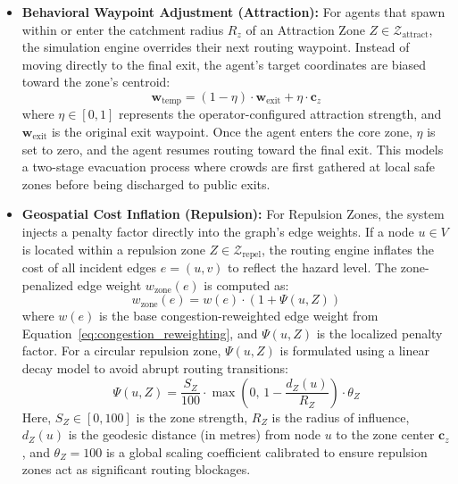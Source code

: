 \documentclass[12pt,a4paper,oneside]{report}
\begin{document}
\begin{itemize}
    \item \textbf{Behavioral Waypoint Adjustment (Attraction):} For agents that spawn within or enter the catchment radius $R_z$ of an Attraction Zone $Z \in \mathcal{Z}_{\text{attract}}$, the simulation engine overrides their next routing waypoint. Instead of moving directly to the final exit, the agent's target coordinates are biased toward the zone's centroid:
    \begin{equation}
    \mathbf{w}_{\text{temp}} = (1 - \eta) \cdot \mathbf{w}_{\text{exit}} + \eta \cdot \mathbf{c}_z
    \label{eq:attraction_waypoint}
    \end{equation}
    where $\eta \in [0, 1]$ represents the operator-configured attraction strength, and $\mathbf{w}_{\text{exit}}$ is the original exit waypoint. Once the agent enters the core zone, $\eta$ is set to zero, and the agent resumes routing toward the final exit. This models a two-stage evacuation process where crowds are first gathered at local safe zones before being discharged to public exits.
    
    \item \textbf{Geospatial Cost Inflation (Repulsion):} For Repulsion Zones, the system injects a penalty factor directly into the graph's edge weights. If a node $u \in V$ is located within a repulsion zone $Z \in \mathcal{Z}_{\text{repel}}$, the routing engine inflates the cost of all incident edges $e = (u, v)$ to reflect the hazard level. The zone-penalized edge weight $w_{\text{zone}}(e)$ is computed as:
    \begin{equation}
    w_{\text{zone}}(e) = w(e) \cdot \left(1 + \Psi(u, Z)\right)
    \label{eq:repulsion_inflation}
    \end{equation}
    where $w(e)$ is the base congestion-reweighted edge weight from Equation~\ref{eq:congestion_reweighting}, and $\Psi(u, Z)$ is the localized penalty factor. For a circular repulsion zone, $\Psi(u, Z)$ is formulated using a linear decay model to avoid abrupt routing transitions:
    \begin{equation}
    \Psi(u, Z) = \frac{S_Z}{100} \cdot \max\left(0, \, 1 - \frac{d_Z(u)}{R_Z}\right) \cdot \theta_Z
    \label{eq:repulsion_decay}
    \end{equation}
    Here, $S_Z \in [0, 100]$ is the zone strength, $R_Z$ is the radius of influence, $d_Z(u)$ is the geodesic distance (in metres) from node $u$ to the zone center $\mathbf{c}_z$, and $\theta_Z = 100$ is a global scaling coefficient calibrated to ensure repulsion zones act as significant routing blockages.
\end{itemize}
\end{document}
